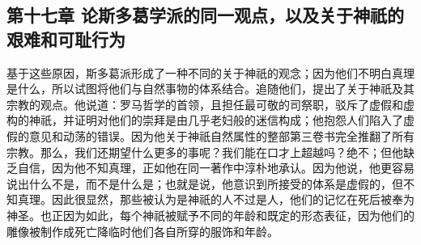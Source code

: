 
\subsection{第十七章 论斯多葛学派的同一观点，以及关于神祇的艰难和可耻行为}

基于这些原因，斯多葛派形成了一种不同的关于神祇的观念；因为他们不明白真理是什么，所以试图将他们与自然事物的体系结合。追随他们，提出了关于神祇及其宗教的观点。他说道：罗马哲学的首领，且担任最可敬的司祭职，驳斥了虚假和虚构的神祇，并证明对他们的崇拜是由几乎老妇般的迷信构成；他抱怨人们陷入了虚假的意见和动荡的错误。因为他关于神祇自然属性的整部第三卷书完全推翻了所有宗教。那么，我们还期望什么更多的事呢？我们能在口才上超越吗？绝不；但他缺乏自信，因为他不知真理，正如他在同一著作中淳朴地承认。因为他说，他更容易说出什么不是，而不是什么是；也就是说，他意识到所接受的体系是虚假的，但不知真理。因此很显然，那些被认为是神祇的人不过是人，他们的记忆在死后被奉为神圣。也正因为如此，每个神祇被赋予不同的年龄和既定的形态表征，因为他们的雕像被制作成死亡降临时他们各自所穿的服饰和年龄。\par

